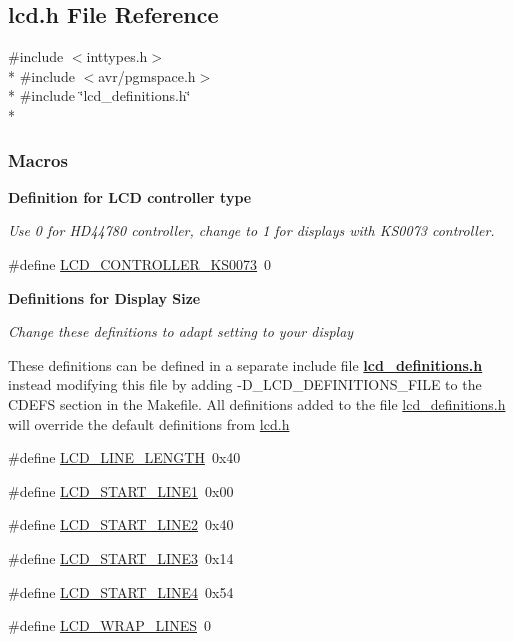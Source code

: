 \hypertarget{a00002}{}\subsection{lcd.\+h File Reference}
\label{a00002}
{\ttfamily \#include $<$inttypes.\+h$>$}\\*
{\ttfamily \#include $<$avr/pgmspace.\+h$>$}\\*
{\ttfamily \#include \char`\"{}lcd\+\_\+definitions.\+h\char`\"{}}\\*
\subsubsection*{Macros}
\begin{Indent}{\bf Definition for L\+CD controller type}\par
{\em Use 0 for H\+D44780 controller, change to 1 for displays with K\+S0073 controller. }\begin{DoxyCompactItemize}
\item 
\#define \hyperlink{a00006_ga63574b03f72a197aeee823aae95dc3b7}{L\+C\+D\+\_\+\+C\+O\+N\+T\+R\+O\+L\+L\+E\+R\+\_\+\+K\+S0073}~0
\end{DoxyCompactItemize}
\end{Indent}
\begin{Indent}{\bf Definitions for Display Size}\par
{\em Change these definitions to adapt setting to your display

These definitions can be defined in a separate include file {\bfseries \hyperlink{a00003_source}{lcd\+\_\+definitions.\+h}} instead modifying this file by adding -\/\+D\+\_\+\+L\+C\+D\+\_\+\+D\+E\+F\+I\+N\+I\+T\+I\+O\+N\+S\+\_\+\+F\+I\+LE to the C\+D\+E\+FS section in the Makefile. All definitions added to the file \hyperlink{a00003_source}{lcd\+\_\+definitions.\+h} will override the default definitions from \hyperlink{a00002}{lcd.\+h} }\begin{DoxyCompactItemize}
\item 
\#define \hyperlink{a00006_gae59a728d9dee9f12c817b29d38746ed9}{L\+C\+D\+\_\+\+L\+I\+N\+E\+\_\+\+L\+E\+N\+G\+TH}~0x40
\item 
\#define \hyperlink{a00006_gabd056d70a1488ea2eb1aef87e248e234}{L\+C\+D\+\_\+\+S\+T\+A\+R\+T\+\_\+\+L\+I\+N\+E1}~0x00
\item 
\#define \hyperlink{a00006_ga7b317b21058ef031716ba040ef75430a}{L\+C\+D\+\_\+\+S\+T\+A\+R\+T\+\_\+\+L\+I\+N\+E2}~0x40
\item 
\#define \hyperlink{a00006_gae7cca16353048a062baeb3a52da55249}{L\+C\+D\+\_\+\+S\+T\+A\+R\+T\+\_\+\+L\+I\+N\+E3}~0x14
\item 
\#define \hyperlink{a00006_gab1b73e05bdb5cc12cdff5a1cf6c4f2a2}{L\+C\+D\+\_\+\+S\+T\+A\+R\+T\+\_\+\+L\+I\+N\+E4}~0x54
\item 
\#define \hyperlink{a00006_gadb35ff6cb242e48ba0545ea919ffc5d3}{L\+C\+D\+\_\+\+W\+R\+A\+P\+\_\+\+L\+I\+N\+ES}~0
\end{DoxyCompactItemize}
\end{Indent}
